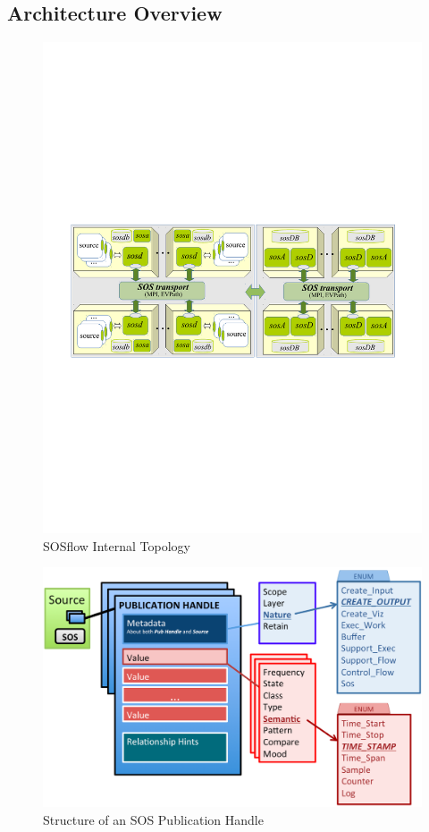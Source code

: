 \subsection{Architecture Overview} %
\begin{figure}[h]
  \centering
  \includegraphics[width=\columnwidth]{images/sos.pdf}
  \caption{SOSflow Internal Topology}
  \label{fig_sos_topology}
\end{figure}


\begin{figure}[h]
\centering
\includegraphics[width=\columnwidth]{images/pub_handle.png}
\caption{Structure of an SOS Publication Handle}
\label{fig_pub_handle}
\end{figure}

